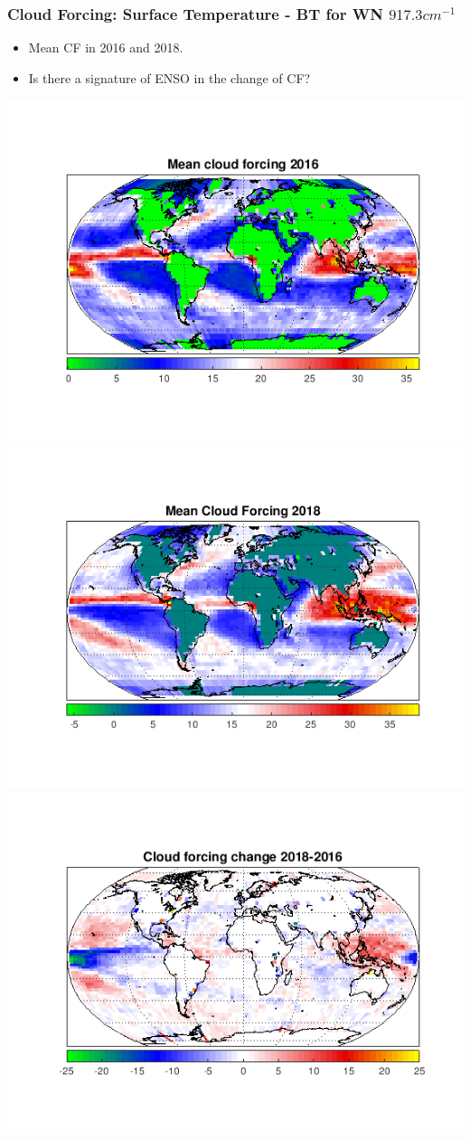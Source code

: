\documentclass[10pt,t]{beamer}
\begin{document}
 \begin{frame}
  \frametitle{Cloud Forcing: Surface Temperature - BT for WN $917.3 cm^{-1}$  }
 \begin{itemize}
    \item Mean CF in 2016 and 2018.
    \item Is there a signature of ENSO in the change of CF? 

 \end{itemize} 
\centering
\includegraphics[width=.4\linewidth]{./figures/mean_cloud_forcing_2016.png}
\includegraphics[width=.4\linewidth]{./figures/mean_cloud_forcing_2018.png} \\
\includegraphics[width=.4\linewidth]{./figures/cloud_forcing_change_2016_2018.png} 

 \end{frame}
\end{document}
